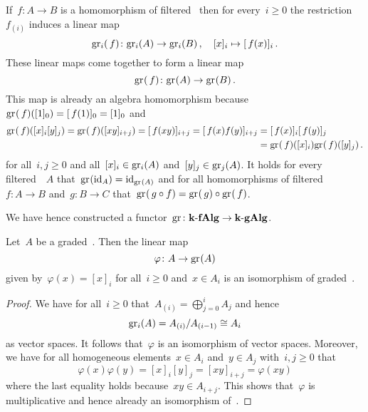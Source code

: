 \begin{construction}
  If~$f \colon A \to B$ is a homomorphism of filtered~{\algebras{$\kf$}} then for every~$i \geq 0$ the restriction~$f_{(i)}$ induces a linear map
  \[
    \gr[i](\spacing f)
    \colon
    \gr[i](A)
    \to
    \gr[i](B) \,,
    \quad
    [x]_i
    \mapsto
    [\spacing f(x)]_i  \,.
  \]
  These linear maps come together to form a linear map
  \[
    \gr(\spacing f)
    \colon
    \gr(A)
    \to
    \gr(B)  \,.
  \]
  This map is already an algebra homomorphism because~$\gr(\spacing f)([1]_0) = [\spacing f(1)]_0 = [1]_0$ and
  \begin{align*}
    \gr(\spacing f)( [x]_i [y]_j )
    =
    \gr(\spacing f)( [xy]_{i+j} )
    =
    [\spacing f(xy)]_{i+j}
    =
    [\spacing f(x) f(y)]_{i+j}
    &=
    [\spacing f(x)]_i [\spacing f(y)]_j
    \\
    &=
    \gr(\spacing f)([x]_i) \gr(\spacing f)([y]_j) \,.
  \end{align*}
  for all~$i, j \geq 0$ and all~$[x]_i \in \gr[i](A)$ and~$[y]_j \in \gr[j](A)$.  
  It holds for every filtered~{\algebra{$\kf$}}~$A$ that~$\gr(\id_A) = \id_{\gr(A)}$ and for all homomorphisms of filtered~{\algebras{$\kf$}}~$f \colon A \to B$ and~$g \colon B \to C$ that~$\gr(\spacing g \circ f) = \gr(\spacing g) \circ \gr(\spacing f)$.
  
  We have hence constructed a functor~$\gr \colon \cfAlg{\kf} \to \cgAlg{\kf}$.
\end{construction}


\begin{lemma}
  Let~$A$ be a graded~{\algebra{$\kf$}}.
  Then the linear map
  \[
    \varphi 
    \colon
    A
    \to
    \gr(A)
  \]
  given by~$\varphi(x) = [x]_i$ for all~$i \geq 0$ and~$x \in A_i$ is an isomorphism of graded~{\algebras{$\kf$}}.
\end{lemma}


\begin{proof}
  We have for all~$i \geq 0$ that~$A_{(i)} = \bigoplus_{j=0}^i A_j$ and hence
  \[
    \gr[i](A)
    =
    A_{(i)} / A_{(i-1)}
    \cong
    A_i
  \]
  as vector spaces.
  It follows that~$\varphi$ is an isomorphism of vector spaces.
  Moreover, we have for all homogeneous elements~$x \in A_i$ and~$y \in A_j$ with~$i, j \geq 0$ that
  \[
    \varphi(x) \varphi(y)
    =
    [x]_i [y]_j
    =
    [xy]_{i+j}
    =
    \varphi(xy)
  \]
  where the last equality holds because~$xy \in A_{i+j}$.
  This shows that~$\varphi$ is multiplicative and hence already an isomorphism of~{\algebras{$\kf$}}.
\end{proof}


